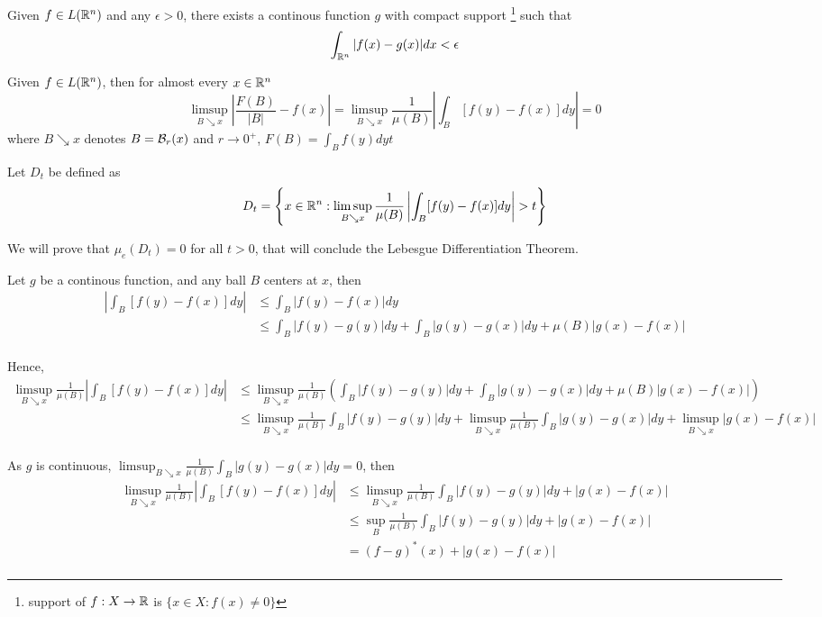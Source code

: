 \documentclass{report}
\begin{document}
\begin{lemma}
    Given $f \in L(\mathbb{R}^n)$ and any $\epsilon > 0$, there exists a continous function $g$ with compact support \footnote{support of $f: X \to \mathbb{R}$ is $\{x \in X: f(x) \neq 0 \}$} such that
    \[
        \int_{\mathbb{R}^n} |f(x) - g(x)| dx < \epsilon
    \]
\end{lemma}

\begin{theorem}
    Given $f \in L(\mathbb{R}^n)$, then for almost every $x \in \mathbb{R}^n$ 
    \[
        \limsup_{B \searrow x} \left| \frac{F(B)}{|B|} - f(x) \right| = \limsup_{B \searrow x} \frac{1}{\mu(B)} \left| \int_B [f(y) - f(x)]dy \right| = 0
    \]
    where $B \searrow x$ denotes $B = \mathcal{B}_r(x)$ and $r \to 0^+$, $F(B) = \int_B f(y) dyt$
\end{theorem}

Let $D_t$ be defined as
\[
    D_t = \left\{ x \in \mathbb{R}^n: \limsup_{B \searrow x}  \frac{1}{\mu(B)} \left| \int_B [f(y) - f(x)]dy \right| > t \right\}
\]

We will prove that $\mu_e(D_t) = 0$ for all $t > 0$, that will conclude the Lebesgue Differentiation Theorem.

Let $g$ be a continous function, and any ball $B$ centers at $x$, then
\begin{align*}
    \left| \int_B [f(y) - f(x)] dy\right|
    &\leq \int_B |f(y) - f(x)| dy \\
    &\leq  \int_B |f(y) - g(y)| dy + \int_B |g(y) - g(x)| dy + \mu(B) |g(x) - f(x)| \\
\end{align*}

Hence,
\begin{align*}
    \limsup_{B \searrow x} \frac{1}{\mu(B)} \left| \int_B [f(y) - f(x)] dy\right|
    &\leq \limsup_{B \searrow x} \frac{1}{\mu(B)} \left(\int_B |f(y) - g(y)| dy + \int_B |g(y) - g(x)| dy + \mu(B) |g(x) - f(x)| \right) \\
    &\leq \limsup_{B \searrow x} \frac{1}{\mu(B)} \int_B |f(y) - g(y)| dy + \limsup_{B \searrow x} \frac{1}{\mu(B)} \int_B |g(y) - g(x)| dy + \limsup_{B \searrow x} |g(x) - f(x)| \\
\end{align*}

As $g$ is continuous, $\limsup_{B \searrow x} \frac{1}{\mu(B)} \int_B |g(y) - g(x)| dy = 0$, then 
\begin{align*}
    \limsup_{B \searrow x} \frac{1}{\mu(B)} \left| \int_B [f(y) - f(x)] dy\right|
    &\leq \limsup_{B \searrow x} \frac{1}{\mu(B)} \int_B |f(y) - g(y)| dy + |g(x) - f(x)| \\
    &\leq \sup_{B} \frac{1}{\mu(B)} \int_B |f(y) - g(y)| dy + |g(x) - f(x)| \\
    &= (f-g)^*(x) + |g(x) - f(x)| \\
\end{align*}
\end{document}
